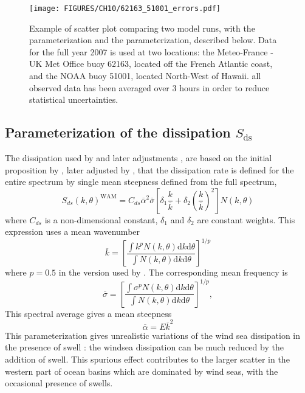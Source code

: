 \begin{figure}[htb]
\centerline{\texttt{[image: FIGURES/CH10/62163\_51001\_errors.pdf]}}
\caption{Example of scatter plot comparing two model runs, with the \cite{Bidlot&al.2005} parameterization 
and the \cite{Ardhuin&al.2010} parameterization, described below. Data for the full year 2007 is used 
at two locations: the  Meteo-France - UK Met Office buoy 
62163, located off the French Atlantic coast, and the NOAA buoy  51001, located North-West of  Hawaii. all observed data 
has been averaged over 3 hours in order to reduce statistical uncertainties.} \label{fig_62163}
\end{figure}




 

\subsection{Parameterization of the dissipation $S_{\mathrm{ds}}$}
The dissipation used by \cite{Bidlot&al.2005} and later adjustments \citep{Bidlot2012}, are based on the initial proposition by 
\cite{Hasselmann1974}, later adjusted by \cite{Komen&al.1984}, that the dissipation rate is defined for the 
entire spectrum by single mean steepness defined from the full spectrum, 
\begin{equation}
S_{ds}\left(k,\theta\right)^{\mathrm{WAM}} = C_{ds}
\overline{\alpha}^2
 \overline{\sigma} \left[\delta_1 \frac{k}{\overline{k}} + \delta_2
\left(\frac{k}{\overline{k}}\right)^2\right]\label{eq:SdsWAM4}
N\left(k,\theta\right)
\end{equation}
where $C_{ds}$ is a non-dimensional constant, 
$\delta_1$ and $\delta_2$ are constant weights. This expression uses a mean wavenumber 
\begin{equation}
\overline{k}=\left[\frac{\int k^p N\left(k,\theta\right){\mathrm d}k  {\mathrm
d} \theta}{\int N\left(k,\theta\right) {\mathrm d}k {\mathrm d}
\theta}\right]^{1/p}
\end{equation}
where $p=0.5$ in the version used by \cite{Bidlot&al.2005}. The corresponding mean frequency is 
\begin{equation}
\overline{\sigma}=\left[\frac{\int \sigma^p N\left(k,\theta\right)
{\mathrm d}k  {\mathrm d} \theta}{ \int N\left(k,\theta\right) {\mathrm d}k  {\mathrm d}
\theta}\right]^{1/p},
\end{equation}
This spectral average gives a mean steepness 
\begin{equation}
\overline{\alpha}=E
\overline{k}^2 
\end{equation}
This parameterization gives unrealistic variations of the wind sea dissipation in the 
presence of swell \citep{Ardhuin&al.2007}: the windsea dissipation can be much reduced by the addition of swell. 
This spurious effect contributes to the 
larger scatter in the western part of ocean basins which are dominated by wind seas, with the occasional 
presence of swells. 

